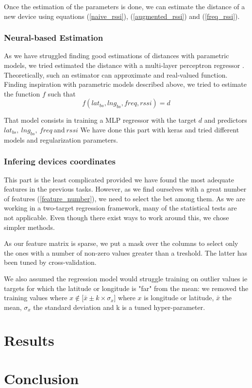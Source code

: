 \documentclass[twocolumn,2pt]{article}
\begin{document}
	Once the estimation of the parameters is done, we can estimate the distance of a new device using equations (\ref{naive_rssi}), (\ref{augmented_rssi}) and (\ref{freq_rssi}).
	
	
	\subsubsection*{Neural-based Estimation} %
	As we have struggled finding good estimations of distances with parametric models, we tried estimated the distance with a multi-layer perceptron regressor \cite{Cybenko1989}. Theoretically, such an estimator can approximate and real-valued function. Finding inspiration with parametric models described above, we tried to estimate the function $f$ such that
	$$ f(lat_{bs}, lng_{bs}, freq, rssi) = d $$
	
	That model consists in training a MLP regressor with the target $d$ and predictors $lat_{bs}, \ lng_{bs}, \ freq \ $and$ \ rssi$ 
	We have done this part with keras and tried different models and regularization parameters.
	
	
	\subsubsection*{Infering devices coordinates}
	This part is the least complicated provided we have found the most adequate features in the previous tasks. However, as we find ourselves with a great number of features (\ref{feature_number}), we need to select the bet among them. As we are working in a two-target regression framework, many of the statistical tests are not applicable. Even though there exist ways to work around this, we chose simpler methods. 
	
	As our feature matrix is sparse, we put a mask over the columns to select only the ones with a number of non-zero values greater than a treshold. The latter has been tuned by cross-validation.
	
	We also assumed the regression model would struggle training on outlier values ie targets for which the latitude or longitude is "far" from the mean: we removed the training values where $ x \notin \lbrack \bar{x} \pm k \times \sigma_x \rbrack $ where $x$ is longitude or latitude, $\bar{x}$ the mean, $\sigma_x$ the standard deviation and k is a tuned hyper-parameter.
	
	
	\section{Results}
	\label{results}
	
	
	\section{Conclusion}
	\label{conclusion}
	
	
	
	
\end{document}
